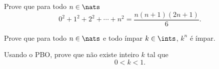\begin{exercise}
    Prove que para todo $n\in\nats$
    $$
        0^2 + 1^2 + 2^2 + \dotsb + n^2 = \frac {n(n + 1)(2n + 1)}6.
    $$
\end{exercise}

\begin{exercise}
    Prove que para todo $n \in\nats$ e todo ímpar $k\in\ints$, $k^n$ é ímpar.
\end{exercise}

\begin{exercise}
    Usando o PBO, prove que não existe inteiro $k$ tal que
    $$
        0 < k < 1.
    $$
\end{exercise}

